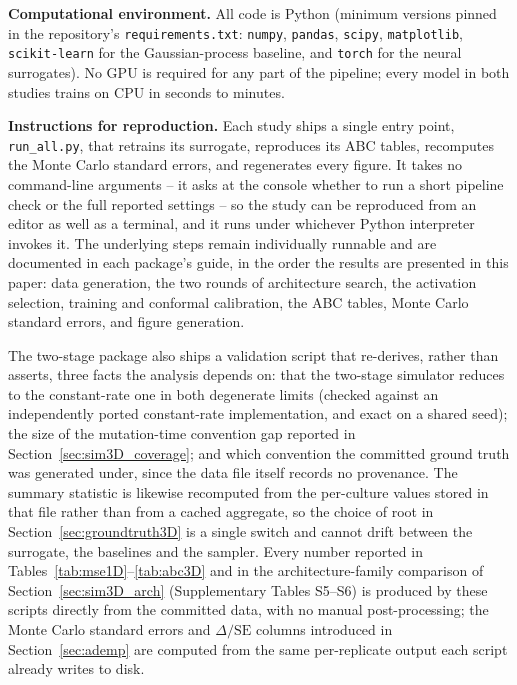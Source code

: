 \documentclass[sn-basic,iicol,pdflatex]{sn-jnl}
\begin{document}
\noindent\textbf{Computational environment.} All code is Python (minimum versions
pinned in the repository's \texttt{requirements.txt}: \texttt{numpy},
\texttt{pandas}, \texttt{scipy}, \texttt{matplotlib}, \texttt{scikit-learn}
for the Gaussian-process baseline, and \texttt{torch} for the neural
surrogates). No GPU is required for any part of the pipeline; every model in
both studies trains on CPU in seconds to minutes.

\noindent\textbf{Instructions for reproduction.} Each study ships a single entry
point, \texttt{run\_all.py}, that retrains its surrogate, reproduces its ABC
tables, recomputes the Monte Carlo standard errors, and regenerates every
figure. It takes no command-line arguments -- it asks at the console whether to
run a short pipeline check or the full reported settings -- so the study can be
reproduced from an editor as well as a terminal, and it runs under whichever
Python interpreter invokes it. The underlying steps remain individually
runnable and are documented in each package's guide, in the order the results
are presented in this paper: data generation, the two rounds of architecture
search, the activation selection, training and conformal calibration, the ABC
tables, Monte Carlo standard errors, and figure generation.

The two-stage package also ships a validation script that re-derives, rather
than asserts, three facts the analysis depends on: that the two-stage simulator
reduces to the constant-rate one in both degenerate limits (checked against an
independently ported constant-rate implementation, and exact on a shared seed);
the size of the mutation-time convention gap reported in
Section~\ref{sec:sim3D_coverage}; and which convention the committed ground
truth was generated under, since the data file itself records no provenance.
The summary statistic is likewise recomputed from the per-culture values stored
in that file rather than from a cached aggregate, so the choice of root in
Section~\ref{sec:groundtruth3D} is a single switch and cannot drift between the
surrogate, the baselines and the sampler. Every number
reported in Tables~\ref{tab:mse1D}--\ref{tab:abc3D} and in the architecture-family
comparison of Section~\ref{sec:sim3D_arch} (Supplementary Tables S5--S6)
is produced by these
scripts directly from the committed data, with no manual post-processing;
the Monte Carlo standard errors and $\Delta/\mathrm{SE}$ columns introduced
in Section~\ref{sec:ademp} are computed from the same per-replicate output
each script already writes to disk.
\end{document}
